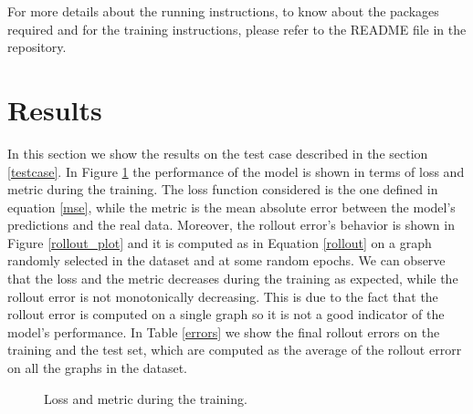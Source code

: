 \documentclass[11pt,a4paper]{article}
\begin{document}
For more details about the running instructions, to know about the packages required and for the training instructions, please refer to the README file in the repository.


\section{Results}
\label{results}
In this section we show the results on the test case described in the section \ref{testcase}. 
In Figure \ref{loss} the performance of the model is shown in terms of loss and metric during the training. 
The loss function considered is the one defined in equation \eqref{mse}, while the metric is the mean absolute error between the model's predictions and the real data. 
Moreover, the rollout error's behavior is shown in Figure \ref{rollout_plot} and it is computed as in Equation \eqref{rollout} on a graph randomly selected in the dataset and at some random epochs. We can observe that the loss and the metric decreases during the training as expected, while the rollout error is not monotonically decreasing. This is due to the fact that the rollout error is computed on a single graph so it is not a good indicator of the model's performance.
In Table \ref{errors} we show the final rollout errors on the training and the test set, which are computed as the average of the rollout errorr on all the graphs in the dataset.

\begin{figure}[H]
    \centering
    \caption{Loss and metric during the training.}
    \label{loss}
\end{figure}
\end{document}
